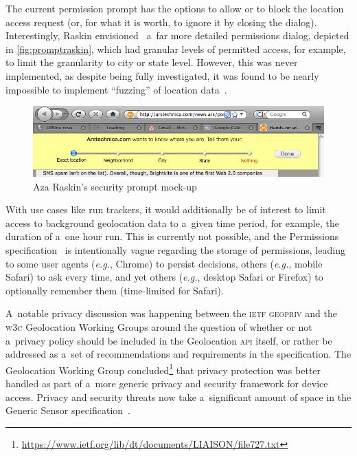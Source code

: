 \documentclass[sigconf,hyphens]{acmart}
\begin{document}
The current permission prompt has the options to allow or to block
the location access request (or, for what it is worth, to ignore it by closing the dialog).
Interestingly, Raskin envisioned~\cite{raskin2010geolocation} a~far more detailed permissions
dialog, depicted in \autoref{fig:promptraskin}, which had granular levels of permitted access,
for example, to limit the granularity to city or state level.
However, this was never implemented, as despite being fully investigated, it was found to be nearly
impossible to implement ``fuzzing'' of location data~\cite{thomson2011obscuring}.

\begin{figure}[h]
  \includegraphics[width=0.85\columnwidth]{mockup-prompt.png}
  \caption{Aza Raskin's security prompt mock-up~\cite{raskin2010geolocation}}
  \label{fig:promptraskin}
\end{figure}

With use cases like run trackers, it would additionally be of interest
to limit access to background geolocation data to a~given time period,
for example, the duration of a~one hour run.
This is currently not possible, and the Permissions specification~\cite{lamouri2017permissions}
is intentionally vague regarding the storage of permissions,
leading to some user agents (\textit{e.g.}, Chrome) to persist decisions,
others (\textit{e.g.}, mobile Safari) to ask every time,
and yet others (\textit{e.g.}, desktop Safari or Firefox)
to optionally remember them (time-limited for Safari).

A~notable privacy discussion was happening between the \textsc{ietf} \textsc{geopriv}
and the \textsc{w3c} Geolocation Working Groups around the question of whether or not
a~privacy policy should be included in the Geolocation \textsc{api} itself,
or rather be addressed as a~set of recommendations and requirements in the specification.
The Geolocation Working Group
concluded\footnote{\url{https://www.ietf.org/lib/dt/documents/LIAISON/file727.txt}}
that privacy protection was better handled
as part of a~more generic privacy and security framework for device access.
Privacy and security threats now take a~significant amount of space
in the Generic Sensor specification~\cite{waldron2018genericsensor}.
\end{document}
